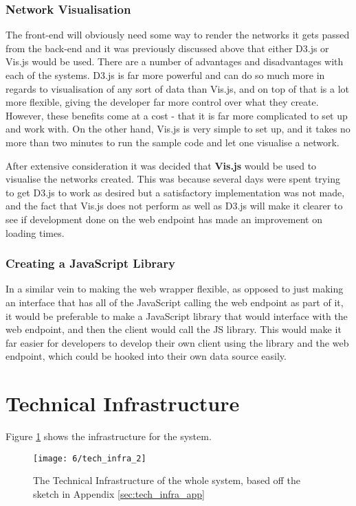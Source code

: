 \documentclass[../dissertation.tex]{subfiles}
\begin{document}
\subsubsection{Network Visualisation}

The front-end will obviously need some way to render the networks it gets passed from the back-end and it was previously discussed above that either D3.js or Vis.js would be used. There are a number of advantages and disadvantages with each of the systems. D3.js is far more powerful and can do so much more in regards to visualisation of any sort of data than Vis.js, and on top of that is a lot more flexible, giving the developer far more control over what they create. However, these benefits come at a cost - that it is far more complicated to set up and work with. On the other hand, Vis.js is very simple to set up, and it takes no more than two minutes to run the sample code and let one visualise a network. 

After extensive consideration it was decided that \textbf{Vis.js} would be used to visualise the networks created. This was because several days were spent trying to get D3.js to work as desired but a satisfactory implementation was not made, and the fact that Vis.js does not perform as well as D3.js will make it clearer to see if development done on the web endpoint has made an improvement on loading times.

\subsubsection{Creating a JavaScript Library}
In a similar vein to making the web wrapper flexible, as opposed to just making an interface that has all of the JavaScript calling the web endpoint as part of it, it would be preferable to make a JavaScript library that would interface with the web endpoint, and then the client would call the JS library. This would make it far easier for developers to develop their own client using the library and the web endpoint, which could be hooked into their own data source easily.

\section{Technical Infrastructure}

Figure \ref{fig:techinfra} shows the infrastructure for the system.

\begin{figure}
    \centering
    \texttt{[image: 6/tech\_infra\_2]}
    \caption{The Technical Infrastructure of the whole system, based off the sketch in Appendix \ref{sec:tech_infra_app}}
    \label{fig:techinfra}
\end{figure}
\end{document}

